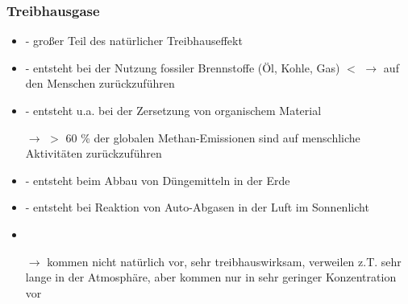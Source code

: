 \begin{frame}
	\frametitle{Treibhausgase}
	\begin{itemize}		
		\item  {\color{red}{Wasserdampf $H_2O$}} -  großer Teil des natürlicher Treibhauseffekt %
		\item  {\color{red}{Kohlenstoffdioxid $CO_2$}} -  entsteht bei der Nutzung fossiler Brennstoffe (Öl, Kohle, Gas) $<$ $\rightarrow$ auf den Menschen zurückzuführen  
		\item  {\color{red}{Methan $CH_4$}} - entsteht u.a. bei der Zersetzung von organischem Material
		\item[$\rightarrow$] $>$ 60 \% der globalen Methan-Emissionen sind auf menschliche Aktivitäten zurückzuführen %
		\item  {\color{red}{Distickstoffmonoxid $N_2O$ (Lachgas)}} - entsteht beim Abbau von Düngemitteln in der Erde
		\item  {\color{red}{Ozon $O_3$}} - entsteht bei Reaktion von Auto-Abgasen in der Luft im Sonnenlicht
		\item {\color{red}{fluorierte Treibhausgase (F-Gase)}}
		\item[$\rightarrow$] kommen nicht natürlich vor, sehr treibhauswirksam, verweilen z.T. sehr lange in der Atmosphäre, %
		aber kommen nur in sehr geringer Konzentration vor
		
	\end{itemize}
\end{frame}

